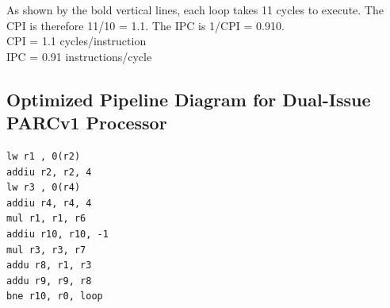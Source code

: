 \documentclass[10pt]{article}
\begin{document}
As shown by the bold vertical lines, each loop takes 11 cycles to execute. The CPI is therefore 11/10 = 1.1. The IPC is 1/CPI = 0.910.\\
CPI = 1.1 cycles/instruction\\
IPC = 0.91 instructions/cycle\\

\subsection{Optimized Pipeline Diagram for Dual-Issue PARCv1 Processor}

\begin{lstlisting}
lw r1 , 0(r2)     
addiu r2, r2, 4   
lw r3 , 0(r4)     
addiu r4, r4, 4   
mul r1, r1, r6    
addiu r10, r10, -1
mul r3, r3, r7    
addu r8, r1, r3   
addu r9, r9, r8   
bne r10, r0, loop                
\end{lstlisting}
\end{document}
